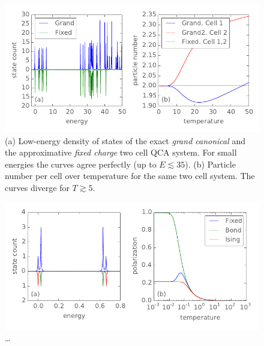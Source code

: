 %
%
\begin{figure}
  \center
  \includegraphics{fixed_charge_approximation}
  \caption{(a) Low-energy density of states of the exact \emph{grand canonical}
  and the approximative \emph{fixed charge} two cell QCA system. For small
  energies the curves agree perfectly (up to $E \lesssim 35$). (b) Particle
  number per cell over temperature for the same two cell system. The curves
  diverge for $T \gtrsim 5$.}
  \label{fig:fixed_charge_approximation}
\end{figure}
%
%
\begin{figure}
  \center
  \includegraphics{ising_approximation1}
  \caption{\ldots}
  \label{fig:ising_approximation1}
\end{figure}
%
%
